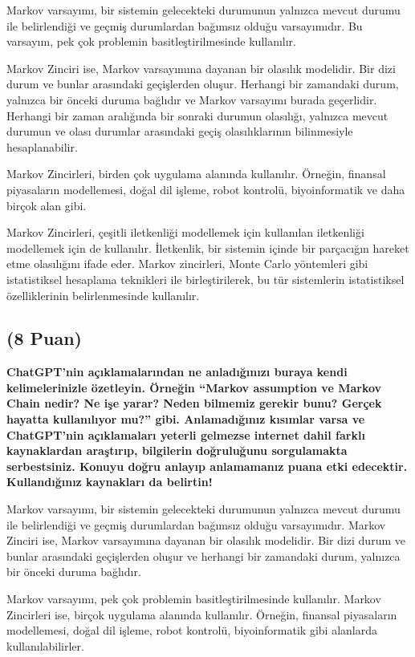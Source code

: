 \documentclass[11pt]{article}
\begin{document}
Markov varsayımı, bir sistemin gelecekteki durumunun yalnızca mevcut durumu ile belirlendiği ve geçmiş durumlardan bağımsız olduğu varsayımıdır. Bu varsayım, pek çok problemin basitleştirilmesinde kullanılır.

Markov Zinciri ise, Markov varsayımına dayanan bir olasılık modelidir. Bir dizi durum ve bunlar arasındaki geçişlerden oluşur. Herhangi bir zamandaki durum, yalnızca bir önceki duruma bağlıdır ve Markov varsayımı burada geçerlidir. Herhangi bir zaman aralığında bir sonraki durumun olasılığı, yalnızca mevcut durumun ve olası durumlar arasındaki geçiş olasılıklarının bilinmesiyle hesaplanabilir.

Markov Zincirleri, birden çok uygulama alanında kullanılır. Örneğin, finansal piyasaların modellemesi, doğal dil işleme, robot kontrolü, biyoinformatik ve daha birçok alan gibi.

Markov Zincirleri, çeşitli iletkenliği modellemek için kullanılan iletkenliği modellemek için de kullanılır. İletkenlik, bir sistemin içinde bir parçacığın hareket etme olasılığını ifade eder. Markov zincirleri, Monte Carlo yöntemleri gibi istatistiksel hesaplama teknikleri ile birleştirilerek, bu tür sistemlerin istatistiksel özelliklerinin belirlenmesinde kullanılır.



\subsection{(8 Puan)} \textbf{ChatGPT’nin açıklamalarından ne anladığınızı buraya kendi kelimelerinizle özetleyin. Örneğin ``Markov assumption ve Markov Chain nedir? Ne işe yarar? Neden bilmemiz gerekir bunu? Gerçek hayatta kullanılıyor mu?'' gibi. Anlamadığınız kısımlar varsa ve ChatGPT’nin açıklamaları yeterli gelmezse internet dahil farklı kaynaklardan araştırıp, bilgilerin doğruluğunu sorgulamakta serbestsiniz. Konuyu doğru anlayıp anlamamanız puana etki edecektir. Kullandığınız kaynakları da belirtin!}

Markov varsayımı, bir sistemin gelecekteki durumunun yalnızca mevcut durumu ile belirlendiği ve geçmiş durumlardan bağımsız olduğu varsayımıdır. Markov Zinciri ise, Markov varsayımına dayanan bir olasılık modelidir. Bir dizi durum ve bunlar arasındaki geçişlerden oluşur ve herhangi bir zamandaki durum, yalnızca bir önceki duruma bağlıdır.

Markov varsayımı, pek çok problemin basitleştirilmesinde kullanılır. Markov Zincirleri ise, birçok uygulama alanında kullanılır. Örneğin, finansal piyasaların modellemesi, doğal dil işleme, robot kontrolü, biyoinformatik gibi alanlarda kullanılabilirler.
\end{document}
